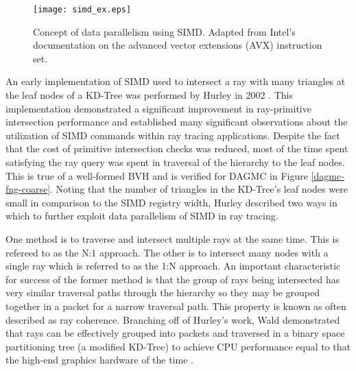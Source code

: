\begin{figure}
  \centering
  \texttt{[image: simd\_ex.eps]}
  \caption[Graphic representation of SIMD operations in CPUs.]{Concept of data parallelism using SIMD. Adapted from Intel's
    documentation on the advanced vector extensions (AVX) instruction
    set. \cite{Intel_AVX}}
  \label{fig:simd}
\end{figure}

An early implementation of SIMD used to intersect a ray with many triangles at
the leaf nodes of a KD-Tree was performed by Hurley in 2002
\cite{Hurley_2002}. This implementation demonstrated a significant improvement
in ray-primitive intersection performance and established many significant
observations about the utilization of SIMD commands within ray tracing
applications. Despite the fact that the cost of primitive intersection checks
was reduced, most of the time spent satisfying the ray query was spent in
traversal of the hierarchy to the leaf nodes. This is true of a well-formed BVH
and is verified for DAGMC in Figure \ref{dagmc-fng-coarse}. Noting that the
number of triangles in the KD-Tree's leaf nodes were small in comparison to the
SIMD registry width, Hurley described two ways in which to further exploit data
parallelism of SIMD in ray tracing.

One method is to traverse and intersect multiple rays at the same time. This is
refereed to as the N:1 approach. The other is to intersect many nodes with a
single ray which is referred to as the 1:N approach. An important characteristic
for success of the former method is that the group of rays being intersected has
very similar traversal paths through the hierarchy so they may be grouped
together in a packet for a narrow traversal path. This property is known as
often described as ray coherence. Branching off of Hurley's work, Wald
demonstrated that rays can be effectively grouped into packets and traversed in
a binary space partitioning tree (a modified KD-Tree) to achieve CPU performance
equal to that the high-end graphics hardware of the time \cite{Wald_2001}.

